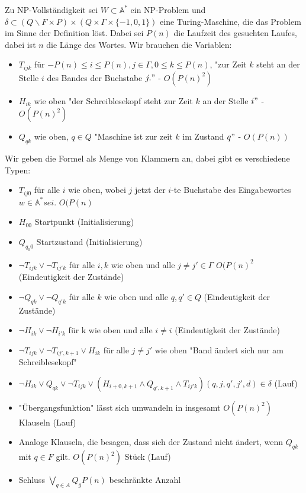 \documentclass[a4paper]{scrartcl}
\begin{document}
Zu NP-Vollständigkeit sei $W \subset \mathbb{A}^*$ ein NP-Problem und $\delta \subset (Q \backslash F \times P) \times (Q \times \Gamma \times \{-1, 0, 1\})$ eine Turing-Maschine, die das Problem im Sinne der Definition löst. Dabei sei $P(n)$ die Laufzeit des gesuchten Laufes, dabei ist $n$ die Länge des Wortes. Wir brauchen die Variablen:
\begin{itemize}
\item $T_{ijk}$ für $- P(n) \leq i \leq P(n), j \in \Gamma, 0 \leq k \leq P(n)$, "zur Zeit $k$ steht an der Stelle $i$ des Bandes der Buchstabe $j."$ - $O(P(n)^2)$
\item $H_{ik}$ wie oben "der Schreiblesekopf steht zur Zeit $k$ an der Stelle $i"$ - $O(P(n)^2)$
\item $Q_{qk}$ wie oben, $q \in Q$ "Maschine ist zur zeit $k$ im Zustand $q"$ - $O(P(n))$
\end{itemize}
Wir geben die Formel als Menge von Klammern an, dabei gibt es verschiedene Typen:
\begin{itemize}
\item $T_{ij0}$ für alle $i$ wie oben, wobei $j$ jetzt der $i$-te Buchstabe des Eingabewortes $w \in \mathbb{A}^* sei.$ $O(P(n)$
\item $H_{00}$ Startpunkt (Initialisierung)
\item $Q_{q_{0}0}$ Startzustand (Initialisierung)
\item $\neg T_{ijk} \vee \neg T_{ij'k}$ für alle $i, k$ wie oben und alle $j \neq j' \in \Gamma$ $O(P(n)^2$ (Eindeutigkeit der Zustände)
\item $\neg Q_{qk} \vee \neg Q_{q'k}$ für alle $k$ wie oben und alle $q, q' \in Q$ (Eindeutigkeit der Zustände)
\item $\neg H_{ik} \vee \neg H_{i'k}$ für k wie oben und alle $i \neq i$ (Eindeutigkeit der Zustände)
\item $\neg T_{ijk} \vee \neg T_{ij',k+1} \vee H_{ik}$ für alle $j \neq j'$ wie oben "Band ändert sich nur am Schreiblesekopf"
\item $\neg H_{ik} \vee Q_{qk} \vee \neg T_{ijk} \vee (H_{i+0, k+1} \wedge Q_{q',k+1} \wedge T_{ij'k}) (q, j, q', j', d) \in \delta$ (Lauf)
\item "Übergangsfunktion" lässt sich umwandeln in insgesamt $O(P(n)^2)$ Klauseln (Lauf)
\item Analoge Klauseln, die besagen, dass sich der Zustand nicht ändert, wenn $Q_{qk}$ mit $q \in F$ gilt. $O(P(n)^2)$ Stück (Lauf)
\item Schluss $\bigvee\limits_{q \in A} Q_g P(n)$ beschränkte Anzahl
\end{itemize}
\end{document}
